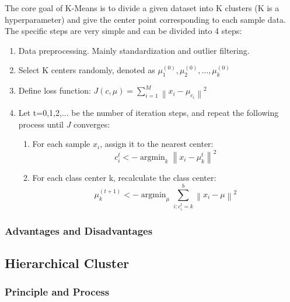 The core goal of K-Means is to divide a given dataset into K clusters (K is a hyperparameter) and give the center point corresponding to each sample data. The specific steps are very simple and can be divided into 4 steps:
\begin{enumerate}[noitemsep]
    \item Data preprocessing. Mainly standardization and outlier filtering.
    \item Select K centers randomly, denoted as $\mu_{1}^{(0)}, \mu_{2}^{(0)}, \ldots, \mu_{k}^{(0)}$
    \item Define loss function: $J(c, \mu)=\sum_{i=1}^{M}\left\|x_{i}-\mu_{c_{i}}\right\|^{2}$
    \item Let t=0,1,2,... be the number of iteration steps, and repeat the following process until $J$ converges:
    \begin{enumerate}
        \item For each sample $x_i$, assign it to the nearest center:
        \begin{equation}
            c_{i}^{t}<-\operatorname{argmin}_{k}\left\|x_{i}-\mu_{k}^{t}\right\|^{2}
        \end{equation}
        \item For each class center k, recalculate the class center: 
        \begin{equation}
            \mu_{k}^{(t+1)}<-\operatorname{argmin}_{\mu} \sum_{i: c_{i}^{t}=k}^{b}\left\|x_{i}-\mu\right\|^{2}
        \end{equation}
    \end{enumerate}
\end{enumerate}

\subsubsection{Advantages and Disadvantages}

\subsection{Hierarchical Cluster}
\subsubsection{Principle and Process}
